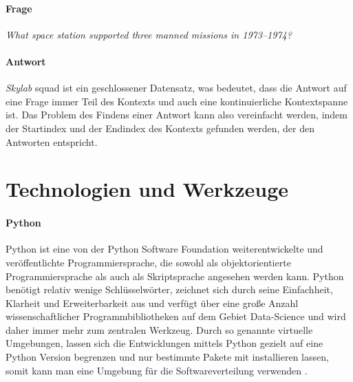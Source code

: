 \documentclass[
        ngerman,
        paper=a4,
        numbers=noendperiod,
]{scrreprt}
\begin{document}
\paragraph{Frage}\textit{What space station supported three manned missions in 1973–1974?}
\paragraph{Antwort}\textit{Skylab}
\newline
\newline
\ac{squad} ist ein geschlossener Datensatz, was bedeutet, dass die Antwort auf eine Frage immer Teil des Kontexts und auch eine kontinuierliche Kontextspanne ist. Das Problem des Findens einer Antwort kann also vereinfacht werden, indem der Startindex und der Endindex des Kontexts gefunden werden, der den Antworten entspricht.

\section{Technologien und Werkzeuge}
\paragraph{Python}
Python ist eine von der Python Software Foundation weiterentwickelte und veröffentlichte Programmiersprache, die sowohl als objektorientierte Programmiersprache als auch als Skriptsprache angesehen werden kann. Python benötigt relativ wenige Schlüsselwörter, zeichnet sich durch seine Einfachheit, Klarheit und Erweiterbarkeit aus und verfügt über eine große Anzahl wissenschaftlicher Programmbibliotheken auf dem Gebiet Data-Science und wird daher immer mehr zum zentralen Werkzeug. 
Durch so genannte virtuelle Umgebungen, lassen sich die Entwicklungen mittels Python gezielt auf eine Python Version begrenzen und nur bestimmte Pakete mit installieren lassen, somit kann man eine Umgebung für die Softwareverteilung verwenden \citep[S. 2]{GrotzGrundkurs0.1.2d}.
\end{document}
